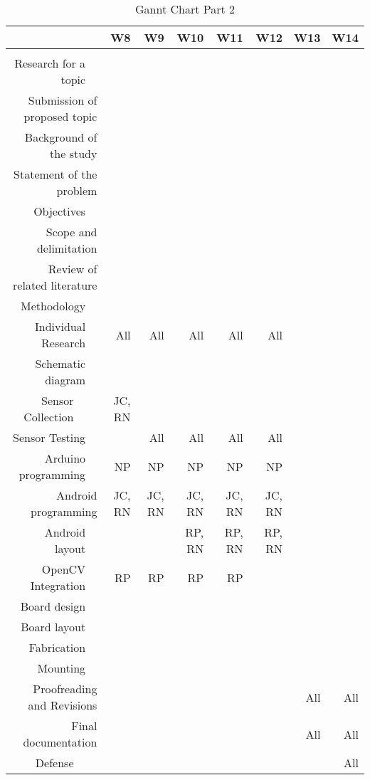 



\begin{table}[htbp]
  \centering
  \caption{Gannt Chart Part 2}
    \begin{tabular}{rrrrrrrrrr}
    \toprule
      &   &   & W8 & W9 & W10 & W11 & W12 & W13 & W14 \\
    \midrule
      &   &   &   &   &   &   &   &   &  \\
    \multicolumn{2}{r}{Research for a topic} &   &   &   &   &   &   &   &  \\
    \multicolumn{3}{r}{Submission of proposed topic} &   &   &   &   &   &   &  \\
    \multicolumn{3}{r}{Background of the study} &   &   &   &   &   &   &  \\
    \multicolumn{3}{r}{Statement of the problem} &   &   &   &   &   &   &  \\
    \multicolumn{2}{r}{Objectives} &   &   &   &   &   &   &   &  \\
    \multicolumn{3}{r}{Scope and delimitation} &   &   &   &   &   &   &  \\
    \multicolumn{3}{r}{Review of related literature} &   &   &   &   &   &   &  \\
    \multicolumn{2}{r}{Methodology} &   &   &   &   &   &   &   &  \\
    \multicolumn{2}{r}{Individual Research} &   & All & All & All & All & All &   &  \\
    \multicolumn{2}{r}{Schematic diagram} &   &   &   &   &   &   &   &  \\
    Sensor Collection &   &   & JC, RN &   &   &   &   &   &  \\
    \multicolumn{2}{r}{Sensor Testing} &   &   & All & All & All & All &   &  \\
    \multicolumn{2}{r}{Arduino programming} &   & NP & NP & NP & NP & NP &   &  \\
    \multicolumn{3}{r}{Android programming} & JC, RN & JC, RN & JC, RN & JC, RN & JC, RN &   &  \\
    \multicolumn{2}{r}{Android layout} &   &   &   & RP, RN & RP, RN & RP, RN &   &  \\
    \multicolumn{2}{r}{OpenCV Integration} &   & RP & RP & RP & RP &   &   &  \\
    \multicolumn{2}{r}{Board design} &   &   &   &   &   &   &   &  \\
    \multicolumn{2}{r}{Board layout} &   &   &   &   &   &   &   &  \\
    \multicolumn{2}{r}{Fabrication} &   &   &   &   &   &   &   &  \\
    \multicolumn{2}{r}{Mounting} &   &   &   &   &   &   &   &  \\
    \multicolumn{3}{r}{Proofreading and Revisions} &   &   &   &   &   & All & All \\
    \multicolumn{3}{r}{Final documentation} &   &   &   &   &   & All & All \\
    Defense &   &   &   &   &   &   &   &   & All \\
    \bottomrule
    \end{tabular}%
  \label{tab:addlabel}%
\end{table}%

